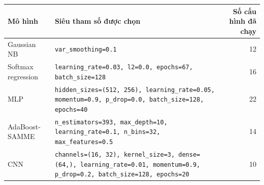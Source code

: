 \begin{tabular}{@{}lp{9.0cm}r@{}}
\toprule
Mô hình & Siêu tham số được chọn & Số cấu hình đã chạy \\
\midrule
Gaussian NB & \texttt{var\_smoothing=0.1} & 12 \\
Softmax regression & \texttt{learning\_rate=0.03, l2=0.0, epochs=67, batch\_size=128} & 16 \\
MLP & \texttt{hidden\_sizes=(512, 256), learning\_rate=0.05, momentum=0.9, p\_drop=0.0, batch\_size=128, epochs=40} & 22 \\
AdaBoost-SAMME & \texttt{n\_estimators=393, max\_depth=10, learning\_rate=0.1, n\_bins=32, max\_features=0.5} & 14 \\
CNN & \texttt{channels=(16, 32), kernel\_size=3, dense=(64,), learning\_rate=0.01, momentum=0.9, p\_drop=0.2, batch\_size=128, epochs=20} & 10 \\
\bottomrule
\end{tabular}
